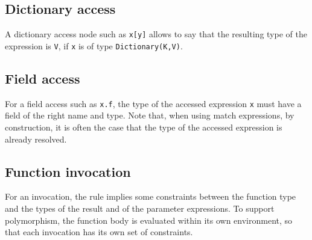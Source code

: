 \documentclass[11pt]{report}
\begin{document}
\begin{center}
 \RightLabel{$ [ \{ freevars(e_i)=\emptyset \}_{i \in [1..n]} ] $}
\DP
\end{center}

\subsection{Dictionary access}

A dictionary access node such as \texttt{x[y]} allows to say that the resulting type of the expression is \texttt{V}, if \texttt{x} is of type \texttt{Dictionary(K,V)}.

\begin{center}
 
\DP
\end{center}

\subsection{Field access}

For a field access such as \texttt{x.f}, the type of the accessed expression \texttt{x} must have a field of the right name and type. Note that, when using match expressions, by construction, it is often the case that the type of the accessed expression is already resolved.

\begin{center}
\DP
\end{center}

\subsection{Function invocation}

For an invocation, the rule implies some constraints between the function type and the types of the result and of the parameter expressions. To support polymorphism, the function body is evaluated within its own environment, so that each invocation has its own set of constraints.

\begin{center}
  
\DP
\end{center}
\end{document}
